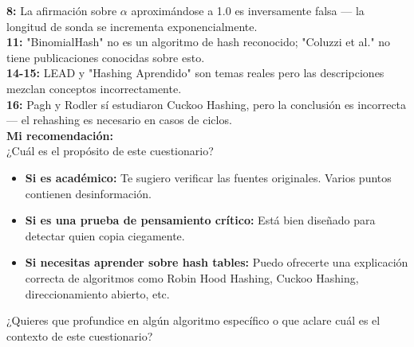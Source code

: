 \documentclass[12pt,a4paper]{report}
\begin{document}
\textbf{8:} La afirmación sobre $\alpha$ aproximándose a 1.0 es inversamente falsa — la longitud de sonda se incrementa exponencialmente.\\

\textbf{11:} "BinomialHash" no es un algoritmo de hash reconocido; "Coluzzi et al." no tiene publicaciones conocidas sobre esto.\\

\textbf{14-15:} LEAD y "Hashing Aprendido" son temas reales pero las descripciones mezclan conceptos incorrectamente.\\

\textbf{16:} Pagh y Rodler sí estudiaron Cuckoo Hashing, pero la conclusión es incorrecta — el rehashing es necesario en casos de ciclos.\\

\textbf{Mi recomendación:}\\
¿Cuál es el propósito de este cuestionario?
\begin{itemize}
    \item \textbf{Si es académico:} Te sugiero verificar las fuentes originales. Varios puntos contienen desinformación.
    \item \textbf{Si es una prueba de pensamiento crítico:} Está bien diseñado para detectar quien copia ciegamente.
    \item \textbf{Si necesitas aprender sobre hash tables:} Puedo ofrecerte una explicación correcta de algoritmos como Robin Hood Hashing, Cuckoo Hashing, direccionamiento abierto, etc.
\end{itemize}
¿Quieres que profundice en algún algoritmo específico o que aclare cuál es el contexto de este cuestionario? 
\end{document}

